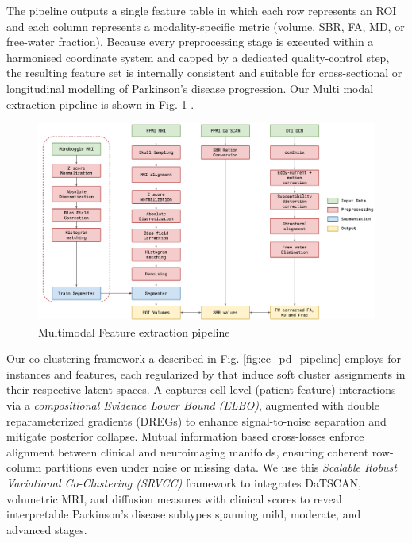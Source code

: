 \documentclass[11pt]{article}
\begin{document}
The pipeline outputs a single feature table in which each row represents an ROI and each column represents a modality-specific metric (volume, SBR, FA, MD, or free-water fraction).  Because every preprocessing stage is executed within a harmonised coordinate system and capped by a dedicated quality-control step, the resulting feature set is internally consistent and suitable for cross-sectional or longitudinal modelling of Parkinson’s disease progression. Our Multi modal extraction pipeline is shown in Fig. \ref{fig:mm_overview} .
\begin{figure}[htbp]
  \centering
  \includegraphics[width=\textwidth]{figures/DTI_fwe.png}
  \caption{Multimodal Feature extraction pipeline}
  \label{fig:mm_overview}
\end{figure}

Our co-clustering framework a described in Fig. \ref{fig:cc_pd_pipeline} employs  for instances and features, each regularized by  that induce soft cluster assignments in their respective latent spaces. A  captures cell-level (patient-feature) interactions via a \textit{compositional Evidence Lower Bound (ELBO)}, augmented with double reparameterized gradients (DREGs) to enhance signal-to-noise separation and mitigate posterior collapse. Mutual information based cross-losses enforce alignment between clinical and neuroimaging manifolds, ensuring coherent row-column partitions even under noise or missing data. 
 We use this \textit{Scalable Robust Variational Co-Clustering (SRVCC)} framework to integrates DaTSCAN, volumetric MRI, and diffusion measures with clinical scores to reveal interpretable Parkinson’s disease subtypes spanning mild, moderate, and advanced stages.
\end{document}
